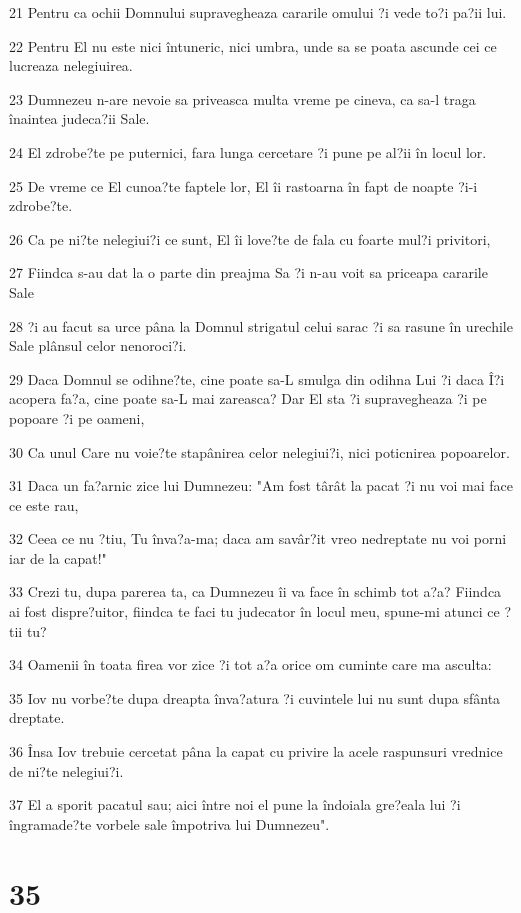 \par 21 Pentru ca ochii Domnului supravegheaza cararile omului ?i vede to?i pa?ii lui.
\par 22 Pentru El nu este nici întuneric, nici umbra, unde sa se poata ascunde cei ce lucreaza nelegiuirea.
\par 23 Dumnezeu n-are nevoie sa priveasca multa vreme pe cineva, ca sa-l traga înaintea judeca?ii Sale.
\par 24 El zdrobe?te pe puternici, fara lunga cercetare ?i pune pe al?ii în locul lor.
\par 25 De vreme ce El cunoa?te faptele lor, El îi rastoarna în fapt de noapte ?i-i zdrobe?te.
\par 26 Ca pe ni?te nelegiui?i ce sunt, El îi love?te de fala cu foarte mul?i privitori,
\par 27 Fiindca s-au dat la o parte din preajma Sa ?i n-au voit sa priceapa cararile Sale
\par 28 ?i au facut sa urce pâna la Domnul strigatul celui sarac ?i sa rasune în urechile Sale plânsul celor nenoroci?i.
\par 29 Daca Domnul se odihne?te, cine poate sa-L smulga din odihna Lui ?i daca Î?i acopera fa?a, cine poate sa-L mai zareasca? Dar El sta ?i supravegheaza ?i pe popoare ?i pe oameni,
\par 30 Ca unul Care nu voie?te stapânirea celor nelegiui?i, nici poticnirea popoarelor.
\par 31 Daca un fa?arnic zice lui Dumnezeu: "Am fost târât la pacat ?i nu voi mai face ce este rau,
\par 32 Ceea ce nu ?tiu, Tu înva?a-ma; daca am savâr?it vreo nedreptate nu voi porni iar de la capat!"
\par 33 Crezi tu, dupa parerea ta, ca Dumnezeu îi va face în schimb tot a?a? Fiindca ai fost dispre?uitor, fiindca te faci tu judecator în locul meu, spune-mi atunci ce ?tii tu?
\par 34 Oamenii în toata firea vor zice ?i tot a?a orice om cuminte care ma asculta:
\par 35 Iov nu vorbe?te dupa dreapta înva?atura ?i cuvintele lui nu sunt dupa sfânta dreptate.
\par 36 Însa Iov trebuie cercetat pâna la capat cu privire la acele raspunsuri vrednice de ni?te nelegiui?i.
\par 37 El a sporit pacatul sau; aici între noi el pune la îndoiala gre?eala lui ?i îngramade?te vorbele sale împotriva lui Dumnezeu".

\chapter{35}

